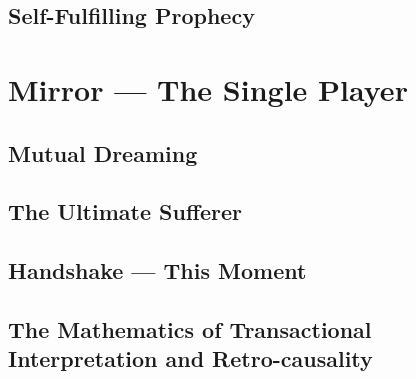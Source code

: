 \documentclass[11pt,a4paper,twoside]{book}
\begin{document}
\chapter{Self-Fulfilling Prophecy}




\part{Mirror --- The Single Player}

\chapter{Mutual Dreaming}




\chapter{The Ultimate Sufferer}







\chapter{Handshake --- This Moment}





\appendix

\chapter{The Mathematics of Transactional Interpretation and Retro-causality}

\end{document}
